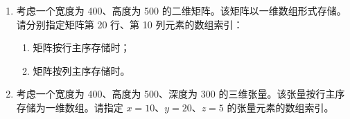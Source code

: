 \begin{enumerate}[label=\arabic*.,leftmargin=2.7em]
  \item 考虑一个宽度为 400、高度为 500 的二维矩阵。该矩阵以一维数组形式存储。
  请分别指定矩阵第 20 行、第 10 列元素的数组索引：
  \begin{enumerate}[label=\alph*.,leftmargin=2.2em]
    \item 矩阵按行主序存储时；
    \item 矩阵按列主序存储时。
  \end{enumerate}

  \item 考虑一个宽度为 400、高度为 500、深度为 300 的三维张量。该张量按行主序
  存储为一维数组。请指定 $x=10$、$y=20$、$z=5$ 的张量元素的数组索引。
\end{enumerate}
